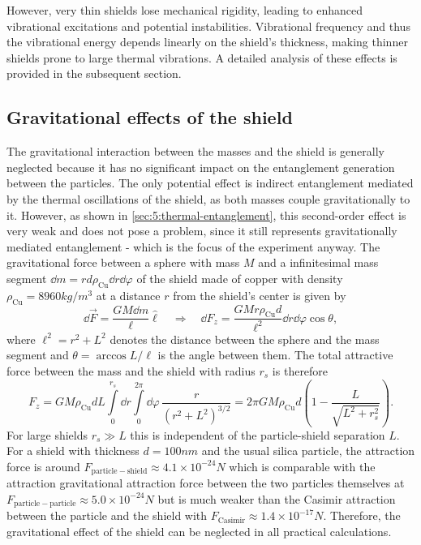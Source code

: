 However, very thin shields lose mechanical rigidity, leading to enhanced vibrational excitations and potential instabilities.
Vibrational frequency and thus the vibrational energy depends linearly on the shield's thickness, making thinner shields prone to large thermal vibrations.
A detailed analysis of these effects is provided in the subsequent section.



\subsection{Gravitational effects of the shield}\label{subsec:5:shield-gravitation}
The gravitational interaction between the masses and the shield is generally neglected because it has no significant impact on the entanglement generation between the particles.
The only potential effect is indirect entanglement mediated by the thermal oscillations of the shield, as both masses couple gravitationally to it. 
However, as shown in \cref{sec:5:thermal-entanglement}, this second-order effect is very weak and does not pose a problem, since it still represents gravitationally mediated entanglement - which is the focus of the experiment anyway.
The gravitational force between a sphere with mass $M$ and a infinitesimal mass segment $\dd m = r d \rho_\mathrm{Cu} \dd r \dd \varphi$ of the shield made of copper with density $\rho_\mathrm{Cu} = 8960\si{kg/m^3}$ at a distance $r$ from the shield's center is given by
\begin{equation}
  \dd \vec{F} = \frac{G M \dd m}{\ell} \boldsymbol{\hat{\ell}} 
  \quad \Rightarrow \quad
  \dd F_z = \frac{G M r \rho_\mathrm{Cu} d}{\ell^2} \dd r \dd \varphi \cos \theta,
\end{equation}
where $\ell^2 = r^2 + L^2$ denotes the distance between the sphere and the mass segment and $\theta = \arccos L/\ell$ is the angle between them.
The total attractive force between the mass and the shield with radius $r_s$ is therefore
\begin{equation}
  F_z = GM \rho_\mathrm{Cu} d L \int\limits_{0}^{r_s} \dd r \int\limits_{0}^{2\pi} \dd \varphi \, \frac{r}{(r^2 + L^2)^{3/2}} = 2\pi G M \rho_\mathrm{Cu} d \left(1 - \frac{L}{\sqrt{L^2 + r_s^2}}\right) .
\end{equation}
For large shields $r_s \gg L$ this is independent of the particle-shield separation $L$.
For a shield with thickness $d = 100\si{nm}$ and the usual silica particle, the attraction force is around $F_\mathrm{particle-shield} \approx 4.1\times 10^{-24} \si{N}$ which is comparable with the attraction gravitational attraction force between the two particles themselves at $F_\mathrm{particle-particle} \approx 5.0 \times 10^{-24}\si{N}$ but is much weaker than the Casimir attraction between the particle and the shield with $F_\mathrm{Casimir} \approx 1.4 \times 10^{-17} \si{N}$.
Therefore, the gravitational effect of the shield can be neglected in all practical calculations.